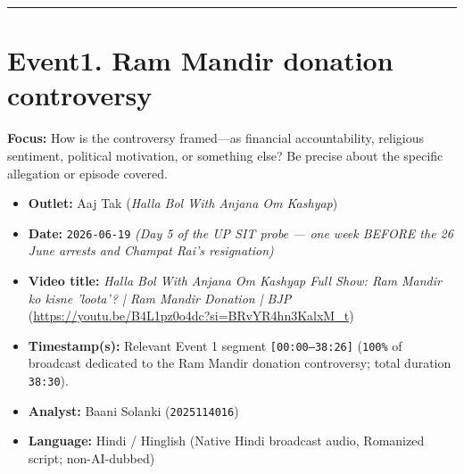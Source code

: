 \documentclass[10pt,a4paper]{article}
\begin{document}
\vspace{4pt}\noindent\rule{\textwidth}{0.4pt}\vspace{4pt}

\section*{Event1. Ram Mandir donation controversy}
\textbf{Focus:} How is the controversy framed---as financial accountability, religious sentiment, political motivation, or something else? Be precise about the specific allegation or episode covered.

\begin{itemize}[leftmargin=1.5em, itemsep=3pt, topsep=4pt]
  \item \textbf{Outlet:} Aaj Tak (\textit{Halla Bol With Anjana Om Kashyap})
  \item \textbf{Date:} \texttt{2026-06-19} \textit{(Day 5 of the UP SIT probe --- one week BEFORE the 26 June arrests and Champat Rai's resignation)}
  \item \textbf{Video title:} \textit{Halla Bol With Anjana Om Kashyap Full Show: Ram Mandir ko kisne 'loota'? | Ram Mandir Donation | BJP} (\url{https://youtu.be/B4L1pz0o4dc?si=BRvYR4hn3KalxM_t})
  \item \textbf{Timestamp(s):} Relevant Event 1 segment \texttt{[00:00--38:26]} (\texttt{100\%} of broadcast dedicated to the Ram Mandir donation controversy; total duration \texttt{38:30}).
  \item \textbf{Analyst:} Baani Solanki (\texttt{2025114016})
  \item \textbf{Language:} Hindi / Hinglish (Native Hindi broadcast audio, Romanized script; non-AI-dubbed)
\end{itemize}
\end{document}
